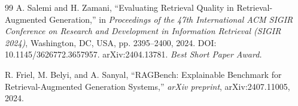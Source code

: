\documentclass[twocolumn,10pt]{article}
\begin{document}
\begin{thebibliography}{99}
A. Salemi and H. Zamani, ``Evaluating Retrieval Quality in Retrieval-Augmented Generation,'' in \emph{Proceedings of the 47th International ACM SIGIR Conference on Research and Development in Information Retrieval (SIGIR 2024)}, Washington, DC, USA, pp. 2395--2400, 2024. DOI: 10.1145/3626772.3657957. arXiv:2404.13781. \emph{Best Short Paper Award.}

R. Friel, M. Belyi, and A. Sanyal, ``RAGBench: Explainable Benchmark for Retrieval-Augmented Generation Systems,'' \emph{arXiv preprint}, arXiv:2407.11005, 2024.

\end{thebibliography}
\end{document}
